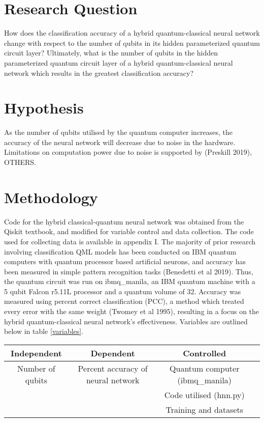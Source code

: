 \documentclass{article}
\begin{document}
\newpage
\section{Research Question}
How does the classification accuracy of a hybrid quantum-classical neural network change with respect to the number of qubits in its hidden parameterized quantum circuit layer? Ultimately, what is the number of qubits in the hidden parameterized quantum circuit layer of a hybrid quantum-classical neural network which results in the greatest classification accuracy?

\section{Hypothesis}
As the number of qubits utilised by the quantum computer increases, the accuracy of the neural network will decrease due to noise in the hardware. Limitations on computation power due to noise is supported by (Preskill 2019), OTHERS.

\section{Methodology}
Code for the hybrid classical-quantum neural network was obtained from the Qiskit textbook, and modified for variable control and data collection. The code used for collecting data is available in appendix I. The majority of prior research involving classification QML models has been conducted on IBM quantum computers with quantum processor based artificial neurons, and accuracy has been measured in simple pattern recognition tasks (Benedetti et al 2019). Thus, the quantum circuit was run on ibmq\_manila, an IBM quantum machine with a 5 qubit 
Falcon r5.11L processor and a quantum volume of 32. Accuracy was measured using percent correct classification (PCC), a method which treated every error with the same weight (Twomey et al 1995), resulting in a focus on the hybrid quantum-classical neural network’s effectiveness. Variables are outlined below in table \ref{variables}.

\begin{center}
\label{variables}
\begin{tabular}{ |c|c|c|c| }
\hline
Independent & Dependent & Controlled \\
\hline
{Number of qubits} & {Percent accuracy of neural network} & {Quantum computer (ibmq\_manila)} \\ 
&  & {Code utilised (hnn.py)} \\ 
&  & {Training and datasets} \\ 
\hline
\end{tabular}
\end{center}
\end{document}

